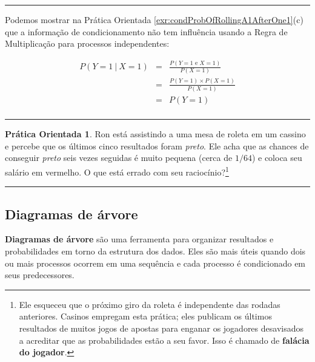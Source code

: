 \documentclass[
]{book}
\theoremstyle{definition}
\theoremstyle{definition}
\theoremstyle{definition}
\newtheorem{exercise}{Prática Orientada}[chapter]
\theoremstyle{definition}
\theoremstyle{remark}
\begin{document}
\begin{center}\rule{0.5\linewidth}{0.5pt}\end{center}

Podemos mostrar na Prática Orientada \ref{exr:condProbOfRollingA1AfterOne1}(c) que a informação de condicionamento não tem influência usando a Regra de Multiplicação para processos independentes:

\begin{eqnarray*}
P(Y=\text{1}\ |\ X=\text{1})
    &=& \frac{P(Y=\text{1 e }X=\text{1})}{P(X=\text{1})} \\
    &=& \frac{P(Y=\text{1})\times P(X=\text{1})}{P(X=\text{1})} \\
    &=& P(Y=\text{1}) \\
\end{eqnarray*}

\begin{center}\rule{0.5\linewidth}{0.5pt}\end{center}

\begin{exercise}
\protect\hypertarget{exr:unnamed-chunk-65}{}{\label{exr:unnamed-chunk-65} }Ron está assistindo a uma mesa de roleta em um cassino e percebe que os últimos cinco resultados foram \emph{preto}. Ele acha que as chances de conseguir \emph{preto} seis vezes seguidas é muito pequena (cerca de \(1/64\)) e coloca seu salário em vermelho. O que está errado com seu raciocínio?\footnote{Ele esqueceu que o próximo giro da roleta é independente das rodadas anteriores. Casinos empregam esta prática; eles publicam os últimos resultados de muitos jogos de apostas para enganar os jogadores desavisados a acreditar que as probabilidades estão a seu favor. Isso é chamado de \textbf{falácia do jogador}.}
\end{exercise}

\begin{center}\rule{0.5\linewidth}{0.5pt}\end{center}

\hypertarget{treeDiagram}{%
\subsection{Diagramas de árvore}\label{treeDiagram}}

\textbf{Diagramas de árvore} são uma ferramenta para organizar resultados e probabilidades em torno da estrutura dos dados. Eles são mais úteis quando dois ou mais processos ocorrem em uma sequência e cada processo é condicionado em seus predecessores.
\end{document}
